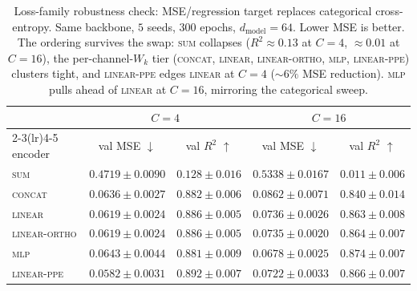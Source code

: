 \begin{table}[t]
\centering
\caption{Loss-family robustness check: MSE/regression target replaces
categorical cross-entropy. Same backbone, $5$ seeds, $300$ epochs,
$d_{\text{model}}{=}64$. Lower MSE is better. The ordering survives
the swap: \textsc{sum} collapses ($R^2 \approx 0.13$ at $C{=}4$,
$\approx 0.01$ at $C{=}16$), the per-channel-$W_k$ tier
(\textsc{concat}, \textsc{linear}, \textsc{linear-ortho}, \textsc{mlp},
\textsc{linear-ppe}) clusters tight, and \textsc{linear-ppe} edges
\textsc{linear} at $C{=}4$ ($\sim$$6\%$ MSE reduction). \textsc{mlp}
pulls ahead of \textsc{linear} at $C{=}16$, mirroring the categorical
sweep.}
\label{tab:mse}
\begin{tabular}{lcccc}
\toprule
  & \multicolumn{2}{c}{$C{=}4$} & \multicolumn{2}{c}{$C{=}16$} \\
\cmidrule(lr){2-3}\cmidrule(lr){4-5}
encoder & val MSE $\downarrow$ & val $R^2$ $\uparrow$ & val MSE $\downarrow$ & val $R^2$ $\uparrow$ \\
\midrule
\textsc{sum}              & $0.4719 \pm 0.0090$ & $0.128 \pm 0.016$ & $0.5338 \pm 0.0167$ & $0.011 \pm 0.006$ \\
\textsc{concat}           & $0.0636 \pm 0.0027$ & $0.882 \pm 0.006$ & $0.0862 \pm 0.0071$ & $0.840 \pm 0.014$ \\
\textsc{linear}           & $0.0619 \pm 0.0024$ & $0.886 \pm 0.005$ & $0.0736 \pm 0.0026$ & $0.863 \pm 0.008$ \\
\textsc{linear-ortho}     & $0.0619 \pm 0.0024$ & $0.886 \pm 0.005$ & $0.0735 \pm 0.0020$ & $0.864 \pm 0.007$ \\
\textsc{mlp}              & $0.0643 \pm 0.0044$ & $0.881 \pm 0.009$ & $0.0678 \pm 0.0025$ & $0.874 \pm 0.007$ \\
\textsc{linear-ppe}       & $0.0582 \pm 0.0031$ & $0.892 \pm 0.007$ & $0.0722 \pm 0.0033$ & $0.866 \pm 0.007$ \\
\bottomrule
\end{tabular}
\end{table}
